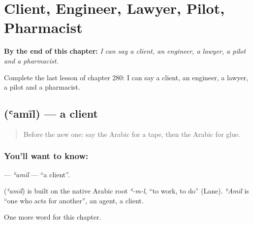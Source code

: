 
\chapter{Client, Engineer, Lawyer, Pilot, Pharmacist}
\label{ch:ar-client-engineer-lawyer-pilot-pharmacist}

\begin{chapteropening}
\textbf{By the end of this chapter:} \emph{I can say a client, an engineer, a lawyer, a pilot and a pharmacist.}

Complete the last lesson of chapter 280: I can say a client, an engineer, a lawyer, a pilot and a pharmacist.
\end{chapteropening}

\section[\texorpdfstring{\ar{عميل} (ʿamīl)}{عميل (ʿamīl)}]{ (ʿamīl) — a client}

\label{lesson:AR-C280-amil2}



\begin{quote}
Before the new one: say the Arabic for a tape, then the Arabic for glue.
\end{quote}

\subsection*{You'll want to know: }
\textbf{} — \emph{ʿamīl} — \textquotedblleft{}a client\textquotedblright{}.

\begin{cousinweb}
\textbf{} (\emph{ʿamīl}) is built on the native Arabic root \emph{ʿ-m-l}, \textquotedblleft{}to work, to do\textquotedblright{} (Lane). \emph{ʿAmīl} is \textquotedblleft{}one who acts for another\textquotedblright{}, an agent, a client.
\end{cousinweb}

\begin{grammarlens}[title={What you've built}]
One more word for this chapter.
\end{grammarlens}

